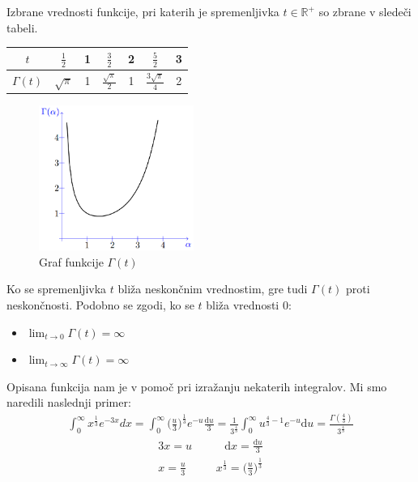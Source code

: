 \documentclass[12pt, a4paper]{article}
\begin{document}
Izbrane vrednosti funkcije, pri katerih je spremenljivka $t \in \mathbb{R^{+}}$ so zbrane v sledeči tabeli. 

\begin{center}
\begin{tabular}{| c || c | c | c | c | c | c |}
\hline
$t$ & $\frac{1}{2}$ & 1 & $\frac{3}{2}$ & 2 & $\frac{5}{2}$ & 3 \\
\hline
$\Gamma (t)$ & $\sqrt{\pi}$ & 1 & $\frac{\sqrt{\pi}}{2}$ & 1 & $\frac{3 \sqrt{\pi}}{4}$ & 2 \\
\hline
\end{tabular}
\end{center}

\begin{figure}[h!]
\centering
\includegraphics[width=0.45\textwidth]{gama}
\caption{Graf funkcije $ \Gamma (t) $}
\label{slika:gama}
\end{figure}


Ko se spremenljivka $t$ bliža neskončnim vrednostim, gre tudi $ \Gamma (t)$ proti neskončnosti. Podobno se zgodi, ko se $t$ bliža vrednosti 0:
\begin{itemize}
\item $ \lim_{t \to 0} \Gamma (t)= \infty $
\item $ \lim_{t \to \infty} \Gamma (t)= \infty $
\end{itemize}

Opisana funkcija nam je v pomoč pri izražanju nekaterih integralov. Mi smo naredili naslednji primer:
\begin{eqnarray*}
\int^{\infty}_{0} x^{\frac{1}{3}} e^{-3x}dx = \int^{\infty}_{0} \Big( \frac{u}{3} \Big)^{\frac{1}{3}} e^{-u}\frac{\mathrm{d} u}{3} = \frac{1}{3^{\frac{4}{3}}} \int^{\infty}_{0} u^{\frac{4}{3} -1} e^{-u} \mathrm{d} u = \frac{\Gamma (\frac{4}{3})}{3^{\frac{4}{3}}} 
\end{eqnarray*}
\begin{eqnarray*} 
3x = u ~~~~~~~~~~~~~ \mathrm{d}x = \frac{\mathrm{d}u}{3} \\
x = \frac{u}{3} ~~~~~~~~~~~~ x^{\frac{1}{3}} = \bigg( \frac{u}{3} \bigg)^{\frac{1}{3}} \\
\end{eqnarray*}
\end{document}
